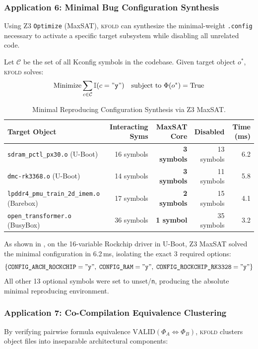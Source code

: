 \documentclass[acmsmall,screen,review]{acmart}
\newcommand{\tool}{\textsc{kfold}\xspace}
\begin{document}
\subsubsection{Application 6: Minimal Bug Configuration Synthesis}
Using Z3 \texttt{Optimize} (MaxSAT), \tool can synthesize the minimal-weight \texttt{.config} necessary to activate a specific target subsystem while disabling all unrelated code.

Let $\mathcal{C}$ be the set of all Kconfig symbols in the codebase. Given target object $o^*$, \tool solves:
$$\text{Minimize} \sum_{c \in \mathcal{C}} \mathbb{I}(c = \mathtt{"y"}) \quad \text{subject to } \Phi(o^*) = \text{True}$$

\begin{table}[t]
\centering
\footnotesize
\setlength{\tabcolsep}{3.5pt}
\caption{Minimal Reproducing Configuration Synthesis via Z3 MaxSAT.}
\label{tab:maxsat}
\begin{tabular}{lrrrr}
\toprule
\textbf{Target Object} & \textbf{Interacting Syms} & \textbf{MaxSAT Core} & \textbf{Disabled} & \textbf{Time (ms)} \\
\midrule
\texttt{sdram\_pctl\_px30.o} (U-Boot) & 16 symbols & \textbf{3 symbols} & 13 symbols & 6.2 \\
\texttt{dmc-rk3368.o} (U-Boot) & 14 symbols & \textbf{3 symbols} & 11 symbols & 5.8 \\
\texttt{lpddr4\_pmu\_train\_2d\_imem.o} (Barebox) & 17 symbols & \textbf{2 symbols} & 15 symbols & 4.1 \\
\texttt{open\_transformer.o} (BusyBox) & 36 symbols & \textbf{1 symbol} & 35 symbols & 3.2 \\
\bottomrule
\end{tabular}
\end{table}

As shown in , on the 16-variable Rockchip driver in U-Boot, Z3 MaxSAT solved the minimal configuration in 6.2\,ms, isolating the exact 3 required options:
$$\{ \texttt{CONFIG\_ARCH\_ROCKCHIP}=\mathtt{"y"}, \; \texttt{CONFIG\_RAM}=\mathtt{"y"}, \; \texttt{CONFIG\_ROCKCHIP\_RK3328}=\mathtt{"y"} \}$$
All other 13 optional symbols were set to unset/\texttt{n}, producing the absolute minimal reproducing environment.

\subsubsection{Application 7: Co-Compilation Equivalence Clustering}
By verifying pairwise formula equivalence $\text{VALID}(\Phi_A \iff \Phi_B)$, \tool clusters object files into inseparable architectural components:
\end{document}
